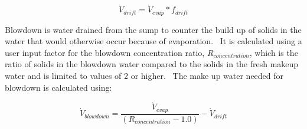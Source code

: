\begin{equation}
{\dot V_{drift}} = {\dot V_{evap}} * {f_{drift}}
\end{equation}

Blowdown is water drained from the sump to counter the build up of solids in the water that would otherwise occur because of evaporation.~ It is calculated using a user input factor for the blowdown concentration ratio, \({R_{concentration}}\), which is the ratio of solids in the blowdown water compared to the solids in the fresh makeup water and is limited to values of 2 or higher.~ The make up water needed for blowdown is calculated using:

\begin{equation}
{\dot V_{blowdown}} = \frac{{{{\dot V}_{evap}}}}{{\left( {{R_{concentration}} - 1.0} \right)}} - {\dot V_{drift}}
\end{equation}
